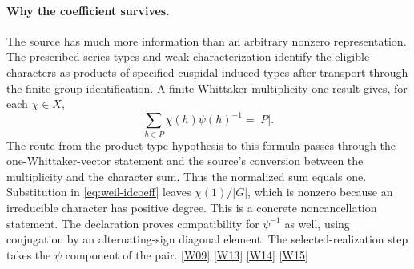 \documentclass[12pt,letterpaper]{article}
\begin{document}
\paragraph{Why the coefficient survives.}
The source has much more information than an arbitrary nonzero representation. The prescribed series types and weak characterization identify the eligible characters as products of specified cuspidal-induced types after transport through the finite-group identification. A finite Whittaker multiplicity-one result gives, for each \(\chi\in X\),
\begin{equation}
     \sum_{h\in P}\chi(h)\psi(h)^{-1}=|P| .
 \label{eq:weil-whit}
\end{equation}
The route from the product-type hypothesis to this formula passes through the one-Whittaker-vector statement and the source's conversion between the multiplicity and the character sum. Thus the normalized sum equals one. Substitution in \eqref{eq:weil-idcoeff} leaves \(\chi(1)/|G|\), which is nonzero because an irreducible character has positive degree. This is a concrete noncancellation statement. The declaration proves compatibility for \(\psi^{-1}\) as well, using conjugation by an alternating-sign diagonal element. The selected-realization step takes the \(\psi\) component of the pair. \href{https://github.com/nousentllc/riemann-hypothesis/blob/40e56bab026552e089d7afcfeff08d2defb9c005/src/Development/AutomorphicArithmetic/ThetaCorrespondence/ThetaPairLifts/ThirdPlaceSeries/ExistsSelectionPairLocalLanglands.lean#L40-L83}{\textsf{[W09]}} \href{https://github.com/nousentllc/riemann-hypothesis/blob/40e56bab026552e089d7afcfeff08d2defb9c005/src/Development/AbelianVarietyTheory/Proofs/SatakeParameters/GoodGenericCharacterOfSeriesTypes.lean#L23-L81}{\textsf{[W13]}} \href{https://github.com/nousentllc/riemann-hypothesis/blob/40e56bab026552e089d7afcfeff08d2defb9c005/src/Development/AbelianVarietyTheory/Proofs/DivisorProofs/IsCuspIndProdCharOfIsProdCuspChar.lean#L23-L29}{\textsf{[W14]}} \href{https://github.com/nousentllc/riemann-hypothesis/blob/40e56bab026552e089d7afcfeff08d2defb9c005/src/Development/AbelianVarietyTheory/Proofs/DivisorProofs/OneWhittakerVectorDimHolds.lean#L8-L13}{\textsf{[W15]}}
\end{document}
